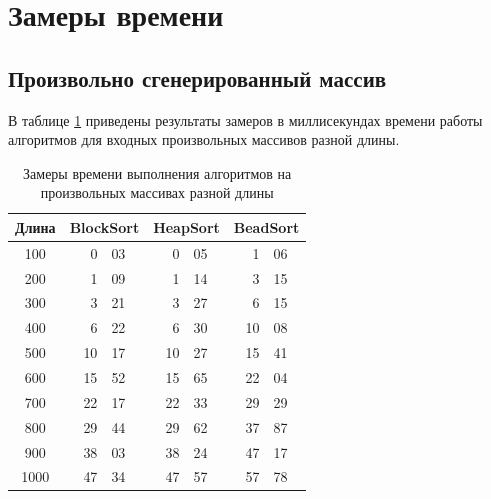 \documentclass[a4paper,14pt, unknownkeysallowed]{extreport}
\begin{document}
\section{Замеры времени}

\subsection{Произвольно сгенерированный массив}

В таблице \ref{table:t} приведены результаты замеров в миллисекундах времени работы алгоритмов для входных произвольных массивов разной длины.

\begin{table}[h!]
    \captionsetup{justification=raggedright,singlelinecheck=off}
    \caption{Замеры времени выполнения алгоритмов на произвольных массивах разной длины}
    \label{table:t}
	\begin{center}
        \begin{tabular}{| c | r@{.}l | r@{.}l | r@{.}l |}
        \hline
        Длина &
        \multicolumn{2}{c|}{BlockSort} & 
        \multicolumn{2}{c|}{HeapSort} &
        \multicolumn{2}{c|}{BeadSort}\\ \hline
        
        100 & 0&03 & 0&05 & 1&06 \\ \hline 
				
        200 & 1&09 & 1&14 & 3&15 \\ \hline 
		
        300 & 3&21 & 3&27 & 6&15 \\ \hline 
				
        400 & 6&22 & 6&30 & 10&08 \\ \hline 
				
        500 & 10&17 & 10&27 & 15&41 \\ \hline
        
        600 & 15&52 & 15&65 & 22&04 \\ \hline 
				
        700 & 22&17 & 22&33 & 29&29 \\ \hline 
				
        800 & 29&44 & 29&62 & 37&87 \\ \hline 
				
        900 & 38&03 & 38&24 & 47&17 \\ \hline 
				
        1000 & 47&34 & 47&57 & 57&78 \\ \hline
       
        \end{tabular}
    \end{center}
\end{table}
\end{document}
